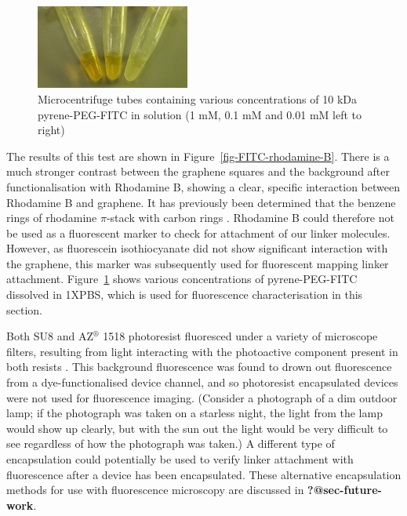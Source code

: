 \documentclass[
  a4paper,
]{scrbook}
\begin{document}
\begin{figure}

{\centering \includegraphics[width=0.45\textwidth,height=\textheight]{figures/ch7/PPF_vials.png}

}

\caption{\label{fig-PPF-concs}Microcentrifuge tubes containing various
concentrations of 10 kDa pyrene-PEG-FITC in solution (1 mM, 0.1 mM and
0.01 mM left to right)}

\end{figure}

The results of this test are shown in Figure~\ref{fig-FITC-rhodamine-B}.
There is a much stronger contrast between the graphene squares and the
background after functionalisation with Rhodamine B, showing a clear,
specific interaction between Rhodamine B and graphene. It has previously
been determined that the benzene rings of rhodamine \(\pi\)-stack with
carbon rings \autocite{Tang2012}. Rhodamine B could therefore not be
used as a fluorescent marker to check for attachment of our linker
molecules. However, as fluorescein isothiocyanate did not show
significant interaction with the graphene, this marker was subsequently
used for fluorescent mapping linker attachment.
Figure~\ref{fig-PPF-concs} shows various concentrations of
pyrene-PEG-FITC dissolved in 1XPBS, which is used for fluorescence
characterisation in this section.

Both SU8 and AZ\(^\circledR\) 1518 photoresist fluoresced under a
variety of microscope filters, resulting from light interacting with the
photoactive component present in both resists \autocite{Pai2007}. This
background fluorescence was found to drown out fluorescence from a
dye-functionalised device channel, and so photoresist encapsulated
devices were not used for fluorescence imaging. (Consider a photograph
of a dim outdoor lamp; if the photograph was taken on a starless night,
the light from the lamp would show up clearly, but with the sun out the
light would be very difficult to see regardless of how the photograph
was taken.) A different type of encapsulation could potentially be used
to verify linker attachment with fluorescence after a device has been
encapsulated. These alternative encapsulation methods for use with
fluorescence microscopy are discussed in \textbf{?@sec-future-work}.
\end{document}
